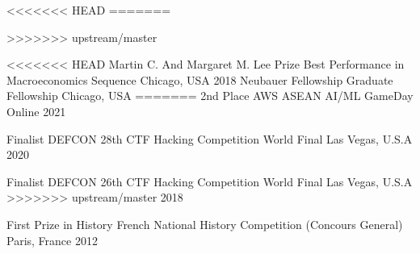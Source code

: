 <<<<<<< HEAD
=======


>>>>>>> upstream/master


\begin{cvhonors}

	<<<<<<< HEAD
	\cvhonor
	{Martin C. And Margaret M. Lee Prize} %
	{Best Performance in Macroeconomics Sequence} %
	{Chicago, USA} %
	{2018} %
	\cvhonor
	{Neubauer Fellowship} %
	{Graduate Fellowship} %
	{Chicago, USA} %
	=======
	\cvhonor
	{2nd Place} %
	{AWS ASEAN AI/ML GameDay} %
	{Online} %
	{2021} %

	\cvhonor
	{Finalist} %
	{DEFCON 28th CTF Hacking Competition World Final} %
	{Las Vegas, U.S.A} %
	{2020} %

	\cvhonor
	{Finalist} %
	{DEFCON 26th CTF Hacking Competition World Final} %
	{Las Vegas, U.S.A} %
	>>>>>>> upstream/master
	{2018} %

	\cvhonor
	{First Prize in History} %
	{French National History Competition (Concours General)} %
	{Paris, France} %
	{2012} %

\end{cvhonors}




